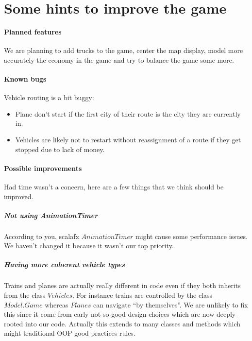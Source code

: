 \documentclass[a4paper]{article}
\begin{document}
	\section{Some hints to improve the game}
	\paragraph{Planned features}
	We are planning to add trucks to the game, center the map display, model more accurately the economy in the game and try to balance the game some more.

	\paragraph{Known bugs}
	Vehicle routing is a bit buggy:
	\begin{itemize}
		\item Plane don't start if the first city of their route is the city they are currently in.
		\item Vehicles are likely not to restart without reassignment of a route if they get stopped due to lack of money.
	\end{itemize}

	\paragraph{Possible improvements} Had time wasn't a concern, here are a few things that we think should be improved.
	\subparagraph{Not using AnimationTimer} According to you, scalafx $AnimationTimer$ might cause some performance issues. We haven't changed it because it wasn't our top priority.
	\subparagraph{Having more coherent vehicle types}
	Trains and planes are actually really different in code even if they both inherits from the class $Vehicles$. For instance trains are controlled by the class $Model.Game$ whereas $Planes$ can navigate ``by themselves''. We are unlikely to fix this since it come from early not-so good design choices which are now deeply-rooted into our code. Actually this extends to many classes and methods which might traditional OOP good practices rules.
\end{document}
